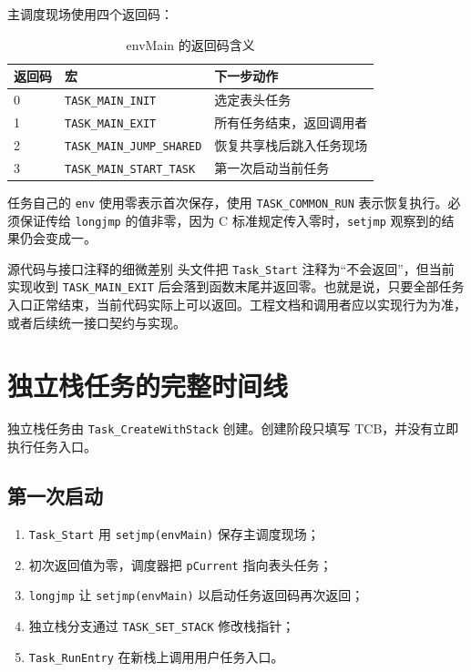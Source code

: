 主调度现场使用四个返回码：

\begin{table}[htbp]
\centering
\caption{envMain 的返回码含义} \label{tab:app-coro-main-code}
\begin{tabular}{lll}
\toprule
返回码 & 宏 & 下一步动作 \\
\midrule
0 & \texttt{TASK\_MAIN\_INIT} & 选定表头任务 \\
1 & \texttt{TASK\_MAIN\_EXIT} & 所有任务结束，返回调用者 \\
2 & \texttt{TASK\_MAIN\_JUMP\_SHARED} & 恢复共享栈后跳入任务现场 \\
3 & \texttt{TASK\_MAIN\_START\_TASK} & 第一次启动当前任务 \\
\bottomrule
\end{tabular}
\end{table}

任务自己的 \texttt{env} 使用零表示首次保存，使用 \texttt{TASK\_COMMON\_RUN} 表示恢复执行。必须保证传给 \texttt{longjmp} 的值非零，因为 C 标准规定传入零时，\texttt{setjmp} 观察到的结果仍会变成一。

\begin{anybox}{源代码与接口注释的细微差别}
头文件把 \texttt{Task\_Start} 注释为“不会返回”，但当前实现收到 \texttt{TASK\_MAIN\_EXIT} 后会落到函数末尾并返回零。也就是说，只要全部任务入口正常结束，当前代码实际上可以返回。工程文档和调用者应以实现行为为准，或者后续统一接口契约与实现。
\end{anybox}

\section{独立栈任务的完整时间线}

独立栈任务由 \texttt{Task\_CreateWithStack} 创建。创建阶段只填写 TCB，并没有立即执行任务入口。

\subsection{第一次启动}

\begin{enumerate}
\item \texttt{Task\_Start} 用 \texttt{setjmp(envMain)} 保存主调度现场；
\item 初次返回值为零，调度器把 \texttt{pCurrent} 指向表头任务；
\item \texttt{longjmp} 让 \texttt{setjmp(envMain)} 以启动任务返回码再次返回；
\item 独立栈分支通过 \texttt{TASK\_SET\_STACK} 修改栈指针；
\item \texttt{Task\_RunEntry} 在新栈上调用用户任务入口。
\end{enumerate}

